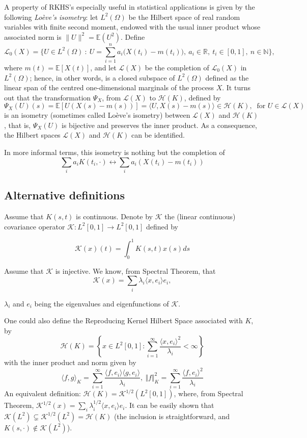 	A property of RKHS's especially useful in statistical applications is given by the following \textit{Lo\`eve's isometry}:  let $L^2(\Omega) $ be the Hilbert space of real random variables with finite second moment, endowed with the usual inner product whose associated norm is $\| U\|^2={\mathbb E}(U^2)$. Define
	$$\mathcal L_0(X) = \big\{U\in L^2(\Omega) \ : \ U=\sum_{i=1}^n a_i \big(X(t_i)-m(t_i)\big),\ a_i\in{\mathbb R},\ t_i\in[0,1],\ n\in{\mathbb N}\big\},$$
	where $m(t)={\mathbb E}[X(t)]$, and let $\mathcal L(X)$ be the completion of $\mathcal L_0(X)$ in  $L^2(\Omega)$; hence, in other words, is a closed subspace of $L^2(\Omega)$ defined as the linear span of the centred one-dimensional marginals of the process $X$. It turns out that the transformation $\Psi_X$, from  $\mathcal L(X)$ to $\mathcal H(K)$, defined by
	\begin{equation}\label{eq:isometry}
	\Psi_X(U)(s) = {\mathbb E}[ U(X(s)-m(s))] = \langle U, X(s)-m(s) \rangle \in \mathcal H(K), \ \text{ for } U\in \mathcal L(X)
	\end{equation}
	is an isometry (sometimes called Lo\`eve's isometry) between $\mathcal L(X)$ and $\mathcal H(K)$, that is, $\Psi_X(U)$ is bijective and preserves the inner product. As a consequence, the Hilbert spaces $\mathcal L(X)$ and $\mathcal H(K)$ can be identified.

	In more informal terms, this isometry is nothing but the completion of
	$$
	\sum_ia_iK(t_i,\cdot)\longleftrightarrow \sum_ia_i(X(t_i)-m(t_i))
	$$

\subsection*{Alternative definitions}

	Assume that $K(s,t)$ is continuous. Denote by ${\mathcal K}$ the (linear continuous) covariance operator ${\mathcal K}:L^2[0,1]\rightarrow L^2[0,1]$ defined by

	$$
	{\mathcal K}(x)(t)=\int_0^1K(s,t)x(s)ds
	$$

	Assume that ${\mathcal K}$ is injective.
	We know, from Spectral Theorem, that
	$${\mathcal K}(x)=\sum_i\lambda_i\langle x,e_i\rangle e_i,$$

	$\lambda_i$ and $e_i$ being the eigenvalues and eigenfunctions of ${\mathcal K}$.

		One could also define the Reproducing Kernel Hilbert Space associated with $K$, by
$$
	{\mathcal H}(K)=\left\{x\in L^2[0,1]:  \sum_{i=1}^\infty\frac{\langle x,e_i\rangle^2}{\lambda_i} <\infty \right\}
	$$
	with the inner product and norm given by
	$$
	\langle f,g\rangle_K=\sum_{i=1}^\infty \frac{\langle f,e_i\rangle \langle g,e_i\rangle}{\lambda_i},\ \Vert f\Vert_K^2=\sum_{i=1}^\infty \frac{\langle f,e_i\rangle^2 }{\lambda_i}
	$$
An equivalent definition:
	${\mathcal H}(K)={\mathcal K}^{1/2}(L^2[0,1])$,
	where, from Spectral Theorem, ${\mathcal K}^{1/2}(x)=\sum_i\lambda_i^{1/2}\langle x,e_i\rangle e_i$. It can be easily shown that ${\mathcal K}(L^2) \varsubsetneq {\mathcal K}^{1/2}(L^2)=\mathcal H(K)$ (the inclusion is straightforward, and $K(s, \cdot)\notin \mathcal K(L^2)$).

